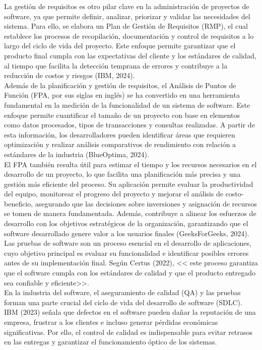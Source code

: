 \documentclass[12pt,letterpaper,spanish, xcolor=table]{report}
\begin{document}
La gestión de requisitos es otro pilar clave en la administración de proyectos de software, ya que permite definir, analizar, priorizar y validar las necesidades del sistema. Para ello, se elabora un Plan de Gestión de Requisitos (RMP), el cual establece los procesos de recopilación, documentación y control de requisitos a lo largo del ciclo de vida del proyecto. Este enfoque permite garantizar que el producto final cumpla con las expectativas del cliente y los estándares de calidad, al tiempo que facilita la detección temprana de errores y contribuye a la reducción de costos y riesgos (IBM, 2024).\\

Además de la planificación y gestión de requisitos, el Análisis de Puntos de Función (FPA, por sus siglas en inglés) se ha convertido en una herramienta fundamental en la medición de la funcionalidad de un sistema de software. Este enfoque permite cuantificar el tamaño de un proyecto con base en elementos como datos procesados, tipos de transacciones y consultas realizadas. A partir de esta información, los desarrolladores pueden identificar áreas que requieren optimización y realizar análisis comparativos de rendimiento con relación a estándares de la industria (BlueOptima, 2024).\\

El FPA también resulta útil para estimar el tiempo y los recursos necesarios en el desarrollo de un proyecto, lo que facilita una planificación más precisa y una gestión más eficiente del proceso. Su aplicación permite evaluar la productividad del equipo, monitorear el progreso del proyecto y mejorar el análisis de costo-beneficio, asegurando que las decisiones sobre inversiones y asignación de recursos se tomen de manera fundamentada. Además, contribuye a alinear los esfuerzos de desarrollo con los objetivos estratégicos de la organización, garantizando que el software desarrollado genere valor a los usuarios finales (GeeksForGeeks, 2024).\\


Las pruebas de software son un proceso esencial en el desarrollo de aplicaciones, cuyo objetivo principal es evaluar su funcionalidad e identificar posibles errores antes de su implementación final. Según Certus (2022), << este proceso garantiza que el software cumpla con los estándares de calidad y que el producto entregado sea confiable y eficiente>>.\\

En la industria del software, el aseguramiento de calidad (QA) y las pruebas forman una parte crucial del ciclo de vida del desarrollo de software (SDLC). IBM (2023) señala que defectos en el software pueden dañar la reputación de una empresa, frustrar a los clientes e incluso generar pérdidas económicas significativas. Por ello, el control de calidad es indispensable para evitar retrasos en las entregas y garantizar el funcionamiento óptico de los sistemas.\\
\end{document}
